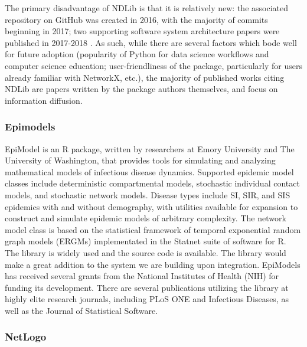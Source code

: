 \documentclass{article}
\begin{document}
The primary disadvantage of NDLib is that it is relatively new: the associated repository on GitHub was created in 2016, with the majority of commits beginning in 2017; two supporting software system architecture papers were published in 2017-2018 \cite{ndlibDocs, NDlib1, NDlib2}. As such, while there are several factors which bode well for future adoption (popularity of Python for data science workflows and computer science education; user-friendliness of the package, particularly for users already familiar with NetworkX, etc.), the majority of published works citing NDLib are papers written by the package authors themselves, and focus on information diffusion. 

\subsubsection{Epimodels}
EpiModel is an R package, written by researchers at Emory University and The University of Washington, that provides tools for simulating and analyzing mathematical models of infectious disease dynamics. Supported epidemic model classes include deterministic compartmental models, stochastic individual contact models, and stochastic network models. Disease types include SI, SIR, and SIS epidemics with and without demography, with utilities available for expansion to construct and simulate epidemic models of arbitrary complexity. The network model class is based on the statistical framework of temporal exponential random graph models (ERGMs) implementated in the Statnet suite of software for R. \cite{JSSv084i08} The library is widely used and the source code is available. The library would make a great addition to the system we are building upon integration. EpiModels has received several grants from the National Institutes of Health (NIH) for funding its development. There are several publications utilizing the library at highly elite research journals, including PLoS ONE and Infectious Diseases, as well as the Journal of Statistical Software.

\subsubsection{NetLogo}
\end{document}
